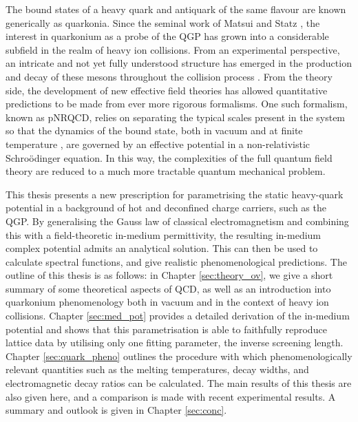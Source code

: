 \documentclass[11pt, a4paper, twoside]{book}
\begin{document}
The bound states of a heavy quark and antiquark of the same flavour are known generically as quarkonia. Since the seminal work of Matsui and Statz \cite{Matsui:1986dk}, the interest in quarkonium as a probe of the QGP has grown into a considerable subfield in the realm of heavy ion collisions. From an experimental perspective, an intricate and not yet fully understood structure has emerged in the production and decay of these mesons throughout the collision process \cite{Aarts:2016hap,Andronic:2015wma}. From the theory side, the development of new effective field theories \cite{Brambilla:2004jw,Brambilla:2000gk,Pineda:2000sz} has allowed quantitative predictions to be made from ever more rigorous formalisms. One such formalism, known as pNRQCD, relies on separating the typical scales present in the system so that the dynamics of the bound state, both in vacuum \cite{Brambilla:2008cx} and at finite temperature \cite{Brambilla:1999xf}, are governed by an effective potential in a non-relativistic Schro{\"o}dinger equation. In this way, the complexities of the full quantum field theory are reduced to a much more tractable quantum mechanical problem.

This thesis presents a new prescription for parametrising the static heavy-quark potential in a background of hot and deconfined charge carriers, such as the QGP. By generalising the Gauss law of classical electromagnetism and combining this with a field-theoretic in-medium permittivity, the resulting in-medium complex potential admits an analytical solution. This can then be used to calculate spectral functions, and give realistic phenomenological predictions. The outline of this thesis is as follows: in Chapter \ref{sec:theory_ov}, we give a short summary of some theoretical aspects of QCD, as well as an introduction into quarkonium phenomenology both in vacuum and in the context of heavy ion collisions. Chapter \ref{sec:med_pot} provides a detailed derivation of the in-medium potential and shows that this parametrisation is able to faithfully reproduce lattice data by utilising only one fitting parameter, the inverse screening length. Chapter \ref{sec:quark_pheno} outlines the procedure with which phenomenologically relevant quantities such as the melting temperatures, decay widths, and electromagnetic decay ratios can be calculated. The main results of this thesis are also given here, and a comparison is made with recent experimental results. A summary and outlook is given in Chapter \ref{sec:conc}. 

\end{document}

